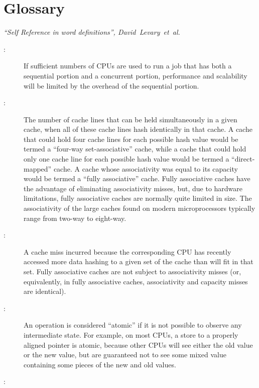 
\chapter{Glossary}
%
	 {\emph{``Self Reference in word definitions'',
	        David~Levary~et~al.}}

\begin{description}
\item[:]
	If sufficient numbers of CPUs are used to run a job that has both
	a sequential portion and a concurrent portion, performance and
	scalability will be limited by the overhead of the sequential
	portion.
\item[:]
	The number of cache lines that can be held simultaneously in
	a given cache, when all of these cache lines hash identically
	in that cache.
	A cache that could hold four cache lines for each possible
	hash value would be termed a ``four-way set-associative'' cache,
	while a cache that could hold only one cache line for each
	possible hash value would be termed a ``direct-mapped'' cache.
	A cache whose associativity was equal to its capacity would
	be termed a ``fully associative'' cache.
	Fully associative caches have the advantage of eliminating
	associativity misses, but, due to hardware limitations,
	fully associative caches are normally quite limited in size.
	The associativity of the large caches found on modern microprocessors
	typically range from two-way to eight-way.
\item[:]
	A cache miss incurred because the corresponding CPU has recently
	accessed more data hashing to a given set of the cache than will
	fit in that set.
	Fully associative caches are not subject to associativity misses
	(or, equivalently, in fully associative caches, associativity
	and capacity misses are identical).
\item[:]
	An operation is considered ``atomic'' if it is not possible to
	observe any intermediate state.
	For example, on most CPUs, a store to a properly aligned pointer
	is atomic, because other CPUs will see either the old value or
	the new value, but are guaranteed not to see some mixed value
	containing some pieces of the new and old values.
\item[:]

\end{description}
